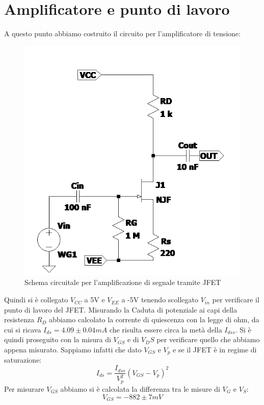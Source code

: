 \documentclass[10pt, a4paper, italian]{article}
\begin{document}
\section{Amplificatore e punto di lavoro}
A questo punto abbiamo costruito il circuito per l'amplificatore di tensione:
\begin{figure}[htbp]
    \centering
	\includegraphics[scale=0.7]{Draft2}
    \caption{Schema circuitale per l'amplificazione di segnale tramite JFET}
\end{figure}
Quindi si è collegato $V_{CC}$ a 5V e $V_{EE}$ a -5V tenendo scollegato $V_{in}$ per verificare il punto di lavoro del JFET.
Misurando la Caduta di potenziale ai capi della resistenza $R_D$ abbiamo calcolato la corrente di quiescenza con la legge di ohm, da cui si ricava $I_{ds}=4.09 \pm 0.04 mA$ che risulta essere circa la metà della $I_{dss}$.
Si è quindi proseguito con la misura di $V_{GS}$ e di $V_DS$ per verificare quello che abbiamo appena misurato.
Sappiamo infatti che dato $V_{GS}$ e $V_p$ e se il JFET è in regime di saturazione:
\begin{equation}
I_{ds}=\frac{I_{dss}}{V_p ^2}(V_{GS}-V_p)^2
\end{equation}
Per misurare $V_{GS}$ abbiamo si è calcolata la differenza tra le misure di $V_G$ e $V_S$:
\[
V_{GS}=-882 \pm 7 mV
\]
\end{document}
